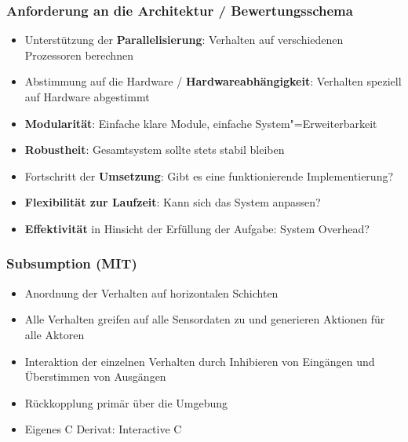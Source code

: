 \subsubsection{Anforderung an die Architektur / Bewertungsschema}
\begin{itemize}
	\item Unterstützung der \textbf{Parallelisierung}: Verhalten auf verschiedenen Prozessoren berechnen
	\item Abstimmung auf die Hardware / \textbf{Hardwareabhängigkeit}: Verhalten speziell auf Hardware abgestimmt
	\item \textbf{Modularität}: Einfache klare Module, einfache System"=Erweiterbarkeit
	\item \textbf{Robustheit}: Gesamtsystem sollte stets stabil bleiben
	\item Fortschritt der \textbf{Umsetzung}: Gibt es eine funktionierende Implementierung?
	\item \textbf{Flexibilität zur Laufzeit}: Kann sich das System anpassen?
	\item \textbf{Effektivität} in Hinsicht der Erfüllung der Aufgabe: System Overhead?
\end{itemize}

\subsubsection{Subsumption (MIT)}
\begin{itemize}
	\item Anordnung der Verhalten auf horizontalen Schichten
	\item Alle Verhalten greifen auf alle Sensordaten zu und generieren Aktionen für alle Aktoren
	\item Interaktion der einzelnen Verhalten durch Inhibieren von Eingängen und Überstimmen von Ausgängen
	\item Rückkopplung primär über die Umgebung
	\item Eigenes C Derivat: Interactive C
\end{itemize}

